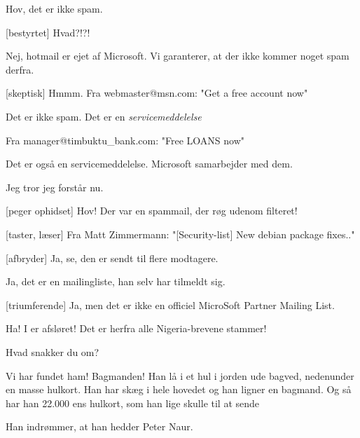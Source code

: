 \documentclass[a4paper,11pt]{article}
\begin{document}
\begin{sketch}
 Hov, det er ikke spam.

[bestyrtet] Hvad?!?!

 Nej, hotmail er ejet af Microsoft. Vi garanterer, at der ikke kommer
noget spam derfra.

[skeptisk] Hmmm. 
   Fra webmaster@msn.com: "Get a free account now"

 Det er ikke spam. Det er en \emph{servicemeddelelse}

 Fra manager@timbuktu\_bank.com: "Free LOANS now"

 Det er også en servicemeddelelse. Microsoft samarbejder med dem.

 Jeg tror jeg forstår nu.

[peger ophidset] Hov! Der var en spammail, der røg udenom filteret!

[taster, læser] Fra Matt Zimmermann: "[Security-list] New debian package fixes.."

[afbryder] Ja, se, den er sendt til flere modtagere.

 Ja, det er en mailingliste, han selv har tilmeldt sig.

[triumferende] Ja, men det er ikke en officiel MicroSoft Partner Mailing List.


 Ha! I er afsløret! Det er herfra alle Nigeria-brevene stammer!

 Hvad snakker du om?

 Vi har fundet ham! Bagmanden! Han lå i et hul i jorden ude bagved,
nedenunder en masse hulkort. Han har skæg i hele hovedet og han ligner en
bagmand. Og så har han 22.000 ens hulkort, som han lige skulle til at sende

Han indrømmer, at han hedder Peter Naur.



\end{sketch}
\end{document}
